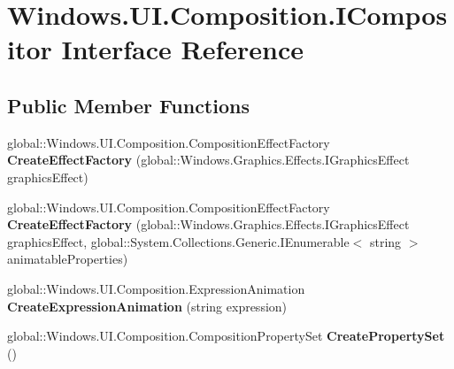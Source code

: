 \hypertarget{interface_windows_1_1_u_i_1_1_composition_1_1_i_compositor}{}\section{Windows.\+U\+I.\+Composition.\+I\+Compositor Interface Reference}
\label{interface_windows_1_1_u_i_1_1_composition_1_1_i_compositor}
\subsection*{Public Member Functions}
\begin{DoxyCompactItemize}
\item 
\mbox{\label{interface_windows_1_1_u_i_1_1_composition_1_1_i_compositor_a741d4bb0d7eef4b99352ca5c3f31e3ab}} 
global\+::\+Windows.\+U\+I.\+Composition.\+Composition\+Effect\+Factory {\bfseries Create\+Effect\+Factory} (global\+::\+Windows.\+Graphics.\+Effects.\+I\+Graphics\+Effect graphics\+Effect)
\item 
\mbox{\label{interface_windows_1_1_u_i_1_1_composition_1_1_i_compositor_ad3ceab4f5a5f9bcd7b75ff2449c924f2}} 
global\+::\+Windows.\+U\+I.\+Composition.\+Composition\+Effect\+Factory {\bfseries Create\+Effect\+Factory} (global\+::\+Windows.\+Graphics.\+Effects.\+I\+Graphics\+Effect graphics\+Effect, global\+::\+System.\+Collections.\+Generic.\+I\+Enumerable$<$ string $>$ animatable\+Properties)
\item 
\mbox{\label{interface_windows_1_1_u_i_1_1_composition_1_1_i_compositor_a6edffff7da37deafae21b5d37ae75419}} 
global\+::\+Windows.\+U\+I.\+Composition.\+Expression\+Animation {\bfseries Create\+Expression\+Animation} (string expression)
\item 
\mbox{\label{interface_windows_1_1_u_i_1_1_composition_1_1_i_compositor_a65caaced591df89e953360feef3dc21c}} 
global\+::\+Windows.\+U\+I.\+Composition.\+Composition\+Property\+Set {\bfseries Create\+Property\+Set} ()
\item 
\mbox{\label{interface_windows_1_1_u_i_1_1_composition_1_1_i_compositor_a0fbfc1dc456d3dee8d1faf78bfe40c9a}} 

\end{DoxyCompactItemize}

